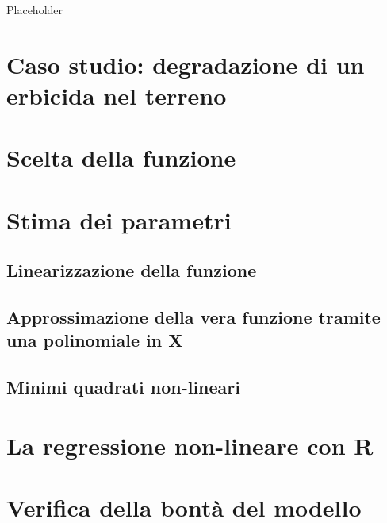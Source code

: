\documentclass[a4paper,12pt,oneside]{book}
\begin{document}
Placeholder

\hypertarget{caso-studio-degradazione-di-un-erbicida-nel-terreno}{%
\section{Caso studio: degradazione di un erbicida nel terreno}\label{caso-studio-degradazione-di-un-erbicida-nel-terreno}}

\hypertarget{scelta-della-funzione}{%
\section{Scelta della funzione}\label{scelta-della-funzione}}

\hypertarget{stima-dei-parametri-4}{%
\section{Stima dei parametri}\label{stima-dei-parametri-4}}

\hypertarget{linearizzazione-della-funzione}{%
\subsection{Linearizzazione della funzione}\label{linearizzazione-della-funzione}}

\hypertarget{approssimazione-della-vera-funzione-tramite-una-polinomiale-in-x}{%
\subsection{Approssimazione della vera funzione tramite una polinomiale in X}\label{approssimazione-della-vera-funzione-tramite-una-polinomiale-in-x}}

\hypertarget{minimi-quadrati-non-lineari}{%
\subsection{Minimi quadrati non-lineari}\label{minimi-quadrati-non-lineari}}

\hypertarget{la-regressione-non-lineare-con-r}{%
\section{La regressione non-lineare con R}\label{la-regressione-non-lineare-con-r}}

\hypertarget{verifica-della-bonta-del-modello}{%
\section{Verifica della bontà del modello}\label{verifica-della-bonta-del-modello}}
\end{document}
